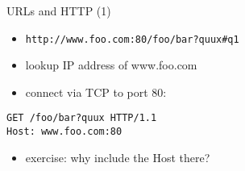 \begin{frame}[fragile]{URLs and HTTP (1)}
\begin{itemize}
    \item \texttt{http://www.foo.com:80/foo/bar?quux\#q1}
    \item lookup IP address of www.foo.com
    \item connect via TCP to port 80:
\end{itemize}
\begin{Verbatim}
GET /foo/bar?quux HTTP/1.1
Host: www.foo.com:80
\end{Verbatim}
\begin{itemize}
    \item exercise: why include the Host there?
\end{itemize}
\end{frame}

